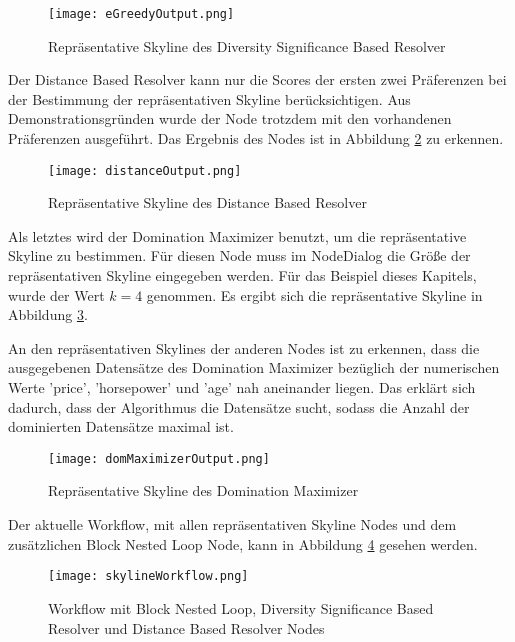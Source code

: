 {\begin{figure}[H]
	\centering
	\texttt{[image: eGreedyOutput.png]}
	\caption{Repräsentative Skyline des Diversity Significance Based Resolver}
	\label{img:eGreedyOutput}
\end{figure} 

Der Distance Based Resolver kann nur die Scores der ersten zwei Präferenzen bei der Bestimmung der repräsentativen Skyline berücksichtigen. Aus Demonstrationsgründen wurde der Node trotzdem mit den vorhandenen Präferenzen ausgeführt. Das Ergebnis des Nodes ist in Abbildung  \ref{img:distanceOutput} zu erkennen.

\begin{figure}[H]
	\centering
	\texttt{[image: distanceOutput.png]}
	\caption{Repräsentative Skyline des Distance Based Resolver}
	\label{img:distanceOutput}
\end{figure} 

Als letztes wird der Domination Maximizer benutzt, um die repräsentative Skyline zu bestimmen. Für diesen Node muss im NodeDialog die Größe der repräsentativen Skyline eingegeben werden. Für  das Beispiel dieses Kapitels, wurde der Wert $k=4$ genommen. Es ergibt sich die repräsentative Skyline in Abbildung \ref{img:domMaximizerOutput}. 

An den repräsentativen Skylines der anderen Nodes ist zu erkennen, dass die ausgegebenen Datensätze des Domination Maximizer bezüglich der numerischen Werte 'price', 'horsepower' und 'age' nah aneinander liegen. Das erklärt sich dadurch, dass der Algorithmus die Datensätze sucht, sodass die Anzahl der dominierten Datensätze maximal ist.

\begin{figure}[H]
	\centering
	\texttt{[image: domMaximizerOutput.png]}
	\caption{Repräsentative Skyline des Domination Maximizer}
	\label{img:domMaximizerOutput}
\end{figure} 

Der aktuelle Workflow, mit allen repräsentativen Skyline Nodes und dem zusätzlichen Block Nested Loop Node, kann in Abbildung \ref{img:skylineWorkflow} gesehen werden.

\begin{figure}[H]
	\centering
	\texttt{[image: skylineWorkflow.png]}
	\caption{Workflow mit Block Nested Loop, Diversity Significance Based Resolver und Distance Based Resolver Nodes}
	\label{img:skylineWorkflow}
\end{figure} 
}
